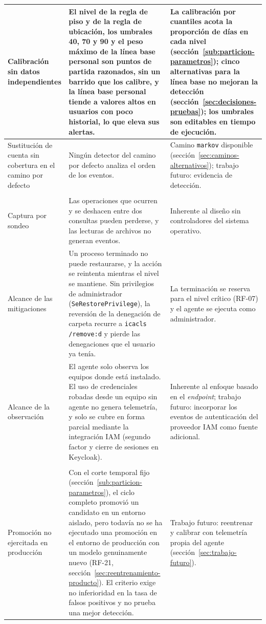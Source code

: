 \begin{longtable}{>{\raggedright\arraybackslash}p{4.4cm}>{\raggedright\arraybackslash}p{5.0cm}>{\raggedright\arraybackslash}p{4.7cm}}
	\hline
	Calibración sin datos independientes & El nivel de la regla de piso y de la regla de ubicación, los umbrales 40, 70 y 90 y el peso máximo de la línea base personal son puntos de partida razonados, sin un barrido que los calibre, y la línea base personal tiende a valores altos en usuarios con poco historial, lo que eleva sus alertas. & La calibración por cuantiles acota la proporción de días en cada nivel (sección~\ref{sub:particion-parametros}); cinco alternativas para la línea base no mejoran la detección (sección~\ref{sec:decisiones-pruebas}); los umbrales son editables en tiempo de ejecución. \\
	\hline
	Sustitución de cuenta sin cobertura en el camino por defecto & Ningún detector del camino por defecto analiza el orden de los eventos. & Camino \texttt{markov} disponible (sección~\ref{sec:caminos-alternativos}); trabajo futuro: evidencia de detección. \\
	\hline
	\multicolumn{3}{l}{\textit{Agente local}} \\
	\hline
	Captura por sondeo & Las operaciones que ocurren y se deshacen entre dos consultas pueden perderse, y las lecturas de archivos no generan eventos. & Inherente al diseño sin controladores del sistema operativo. \\
	\hline
	Alcance de las mitigaciones & Un proceso terminado no puede restaurarse, y la acción se reintenta mientras el nivel se mantiene. Sin privilegios de administrador (\texttt{SeRestorePrivilege}), la reversión de la denegación de carpeta recurre a \texttt{icacls /remove:d} y pierde las denegaciones que el usuario ya tenía. & La terminación se reserva para el nivel crítico (RF-07) y el agente se ejecuta como administrador. \\
	\hline
	Alcance de la observación & El agente solo observa los equipos donde está instalado. El uso de credenciales robadas desde un equipo sin agente no genera telemetría, y solo se cubre en forma parcial mediante la integración IAM (segundo factor y cierre de sesiones en Keycloak). & Inherente al enfoque basado en el \emph{endpoint}; trabajo futuro: incorporar los eventos de autenticación del proveedor IAM como fuente adicional. \\
	\hline
	\multicolumn{3}{l}{\textit{Reentrenamiento}} \\
	\hline
	Promoción no ejercitada en producción & Con el corte temporal fijo (sección~\ref{sub:particion-parametros}), el ciclo completo promovió un candidato en un entorno aislado, pero todavía no se ha ejecutado una promoción en el entorno de producción con un modelo genuinamente nuevo (RF-21, sección~\ref{sec:reentrenamiento-producto}). El criterio exige no inferioridad en la tasa de falsos positivos y no prueba una mejor detección. & Trabajo futuro: reentrenar y calibrar con telemetría propia del agente (sección~\ref{sec:trabajo-futuro}). \\

\end{longtable}
